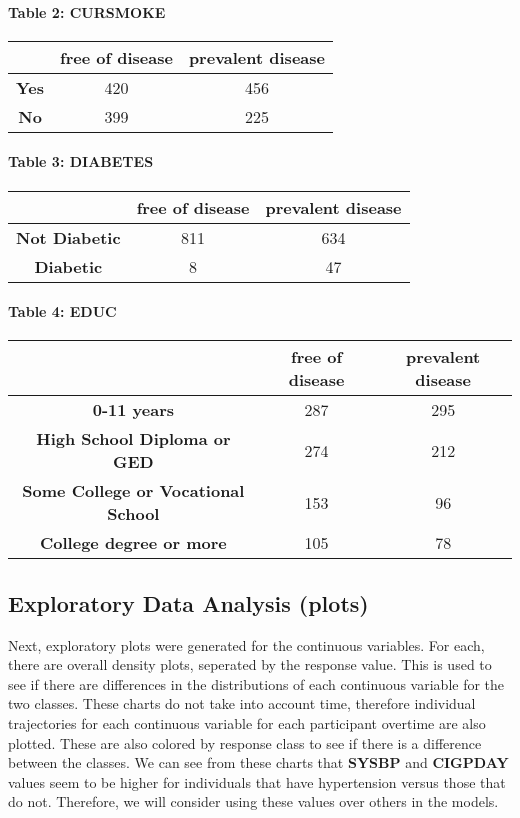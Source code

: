 \documentclass[11pt]{article}
\begin{document}
    \hypertarget{table-2-cursmoke}{%
\paragraph{Table 2: CURSMOKE}\label{table-2-cursmoke}}

    \begin{longtable}[]{@{}ccc@{}}
\toprule
~ & free of disease & prevalent disease\tabularnewline
\midrule
\endhead
\textbf{Yes} & 420 & 456\tabularnewline
\textbf{No} & 399 & 225\tabularnewline
\bottomrule
\end{longtable}

    \hypertarget{table-3-diabetes}{%
\paragraph{Table 3: DIABETES}\label{table-3-diabetes}}

    \begin{longtable}[]{@{}ccc@{}}
\toprule
~ & free of disease & prevalent disease\tabularnewline
\midrule
\endhead
\textbf{Not Diabetic} & 811 & 634\tabularnewline
\textbf{Diabetic} & 8 & 47\tabularnewline
\bottomrule
\end{longtable}

    \hypertarget{table-4-educ}{%
\paragraph{Table 4: EDUC}\label{table-4-educ}}

    \begin{longtable}[]{@{}ccc@{}}
\toprule
~ & free of disease & prevalent disease\tabularnewline
\midrule
\endhead
\textbf{0-11 years} & 287 & 295\tabularnewline
\textbf{High School Diploma or GED} & 274 & 212\tabularnewline
\textbf{Some College or Vocational School} & 153 & 96\tabularnewline
\textbf{College degree or more} & 105 & 78\tabularnewline
\bottomrule
\end{longtable}

    \hypertarget{exploratory-data-analysis-plots}{%
\subsection{Exploratory Data Analysis
(plots)}\label{exploratory-data-analysis-plots}}

    Next, exploratory plots were generated for the continuous variables. For
each, there are overall density plots, seperated by the response value.
This is used to see if there are differences in the distributions of
each continuous variable for the two classes. These charts do not take
into account time, therefore individual trajectories for each continuous
variable for each participant overtime are also plotted. These are also
colored by response class to see if there is a difference between the
classes. We can see from these charts that \textbf{SYSBP} and
\textbf{CIGPDAY} values seem to be higher for individuals that have
hypertension versus those that do not. Therefore, we will consider using
these values over others in the models.
\end{document}
